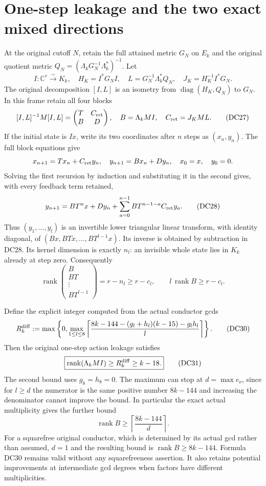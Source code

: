 \documentclass[11pt]{article}
\newcommand{\C}{\mathbb C}
\newcommand{\rank}{\operatorname{rank}}
\newcommand{\diag}{\operatorname{diag}}
\begin{document}
\section{One-step leakage and the two exact mixed directions}
At the original cutoff $N$, retain the full attained metric $G_N$ on
$E_k$ and the original quotient metric
$Q_N=(\Lambda_kG_N^{-1}\Lambda_k^*)^{-1}$.  Let
\[
 I:\C^r\overset{\sim}{\longrightarrow}K_k,\quad
 H_K=I^*G_NI,\quad L=G_N^{-1}\Lambda_k^*Q_N,
 \quad J_K=H_K^{-1}I^*G_N.
\]
The original decomposition $[I,L]$ is an isometry from
$\diag(H_K,Q_N)$ to $G_N$.  In this frame retain all four blocks
\[
 [I,L]^{-1}M[I,L]=\begin{pmatrix}T&C_{\rm ret}\\B&D\end{pmatrix},
 \quad B=\Lambda_kMI,\quad C_{\rm ret}=J_KML.                    \tag{DC27}
\]
If the initial state is $Ix$, write its two coordinates after $n$
steps as $(x_n,y_n)$.  The full block equations give
\[
 x_{n+1}=Tx_n+C_{\rm ret}y_n,\quad
 y_{n+1}=Bx_n+Dy_n,\quad x_0=x,\quad y_0=0.
\]
Solving the first recursion by induction and substituting it in the
second gives, with every feedback term retained,
\[
 y_{n+1}=BT^nx+Dy_n+
            \sum_{a=0}^{n-1}BT^{n-1-a}C_{\rm ret}y_a.           \tag{DC28}
\]
Thus $(y_1,\ldots,y_l)$ is an invertible lower triangular linear
transform, with identity diagonal, of
$(Bx,BTx,\ldots,BT^{l-1}x)$.  Its inverse is obtained by subtraction
in DC28.  Its kernel dimension is exactly $n_l$: an invisible whole
state lies in $K_k$ already at step zero.  Consequently
\[
 \rank\begin{pmatrix}B\\BT\\\vdots\\BT^{l-1}\end{pmatrix}
   =r-n_l\ge r-c_l,\qquad
 l\,\rank B\ge r-c_l.                                           \tag{DC29}
\]

Define the explicit integer computed from the actual conductor gcds
\[
 R_k^{\rm diff}:=
 \max\left\{0,\max_{1\le l\le8}
 \left\lceil\frac{8k-144-(g_l+h_l)(k-15)-g_lh_l}{l}\right\rceil
                                                    \right\}.
                                                                    \tag{DC30}
\]
Then the original one-step action leakage satisfies
\[
 \boxed{\rank(\Lambda_kMI)\ge R_k^{\rm diff}\ge k-18.}          \tag{DC31}
\]
The second bound uses $g_8=h_8=0$.  The maximum can stop at
$d=\max e_\nu$, since for $l\ge d$ the numerator is the same
positive number $8k-144$ and increasing the denominator cannot
improve the bound.  In particular the exact actual multiplicity
gives the further bound
\[
 \rank B\ge\left\lceil\frac{8k-144}{d}\right\rceil.             \tag{DC32}
\]
For a squarefree original conductor, which is determined by its
actual gcd rather than assumed, $d=1$ and the resulting bound is
$\rank B\ge8k-144$.  Formula DC30 remains valid without any
squarefreeness assertion.  It also retains potential improvements
at intermediate gcd degrees when factors have different multiplicities.
\end{document}
